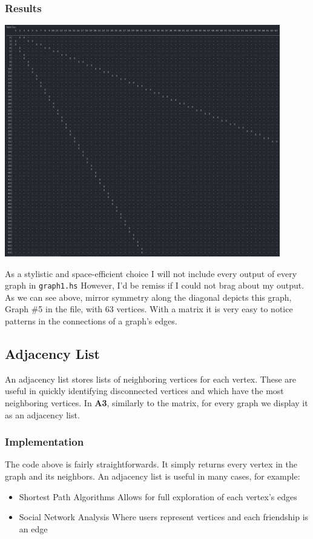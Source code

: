 \documentclass[12pt, letterpaper]{article}
\begin{document}
\subsubsection{Results}
\begin{center}
   \includegraphics[width=120mm,scale=0.5]{Images/Graph3_Matrix.png}
\end{center}
As a stylistic and space-efficient choice I will not include every output of every graph in \texttt{graph1.hs}
However, I'd be remiss if I could not brag about my output.
As we can see above, mirror symmetry along the diagonal depicts this graph, Graph \#5 in the file, with 63 vertices.
With a matrix it is very easy to notice patterns in the connections of a graph's edges.

\subsection{Adjacency List} \label{AdjList}
An adjacency list stores lists of neighboring vertices for each vertex.
These are useful in quickly identifying disconnected vertices and which have the most neighboring vertices.
In \textbf{A3}, similarly to the matrix, for every graph we display it as an adjacency list.
\subsubsection{Implementation}
\begin{center}
   
\end{center}
The code above is fairly straightforwards. It simply returns every vertex in the graph and its neighbors.
An adjacency list is useful in many cases, for example:
\begin{itemize}
   \item Shortest Path Algorithms
   \subitem Allows for full exploration of each vertex's edges
   \item Social Network Analysis
   \subitem Where users represent vertices and each friendship is an edge
\end{itemize}
\end{document}

